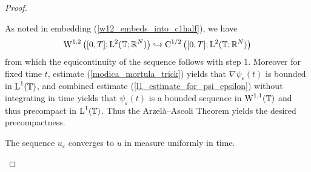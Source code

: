 \begin{proof}
\begin{description}[wide=0pt]
		As noted in embedding (\ref{w12_embeds_into_c1half}), we have
		\begin{equation*}
			\operatorname{W}^{ 1 , 2 } \left( [ 0 , T ] ; \operatorname{L}^{ 2 } ( \operatorname{\mathbb{T}} ; \mathbb{ R }^{ N } ) \right)
			\hookrightarrow
			\operatorname{C}^{ 1 / 2 } \left( [ 0 , T ] ; \operatorname{L}^{ 2 } ( \operatorname{\mathbb{T}} ; \mathbb{ R }^{ N } ) \right)
		\end{equation*}
		from which the equicontinuity of the sequence follows with step 1.
		Moreover for fixed time $ t $, estimate (\ref{modica_mortula_trick}) yields that $ \nabla \psi_{ \varepsilon } ( t ) $ is bounded in $ \operatorname{L}^{ 1 } ( \operatorname{\mathbb{T}} ) $, and combined estimate (\ref{l1_estimate_for_psi_epsilon}) without integrating in time yields that $ \psi_{ \varepsilon } ( t ) $ is a bounded sequence in $ \operatorname{W}^{ 1 , 1 } ( \operatorname{\mathbb{T}} ) $ and thus precompact in $ \operatorname{L}^{ 1 } ( \operatorname{\mathbb{T}} ) $.
		Thus the Arzelà--Ascoli Theorem yields the desired precompactness.
		
		\item[Step 3:] The sequence $ u_{ \varepsilon } $ converges to $ u $ in measure uniformly in time.
		

\end{description}
\end{proof}
